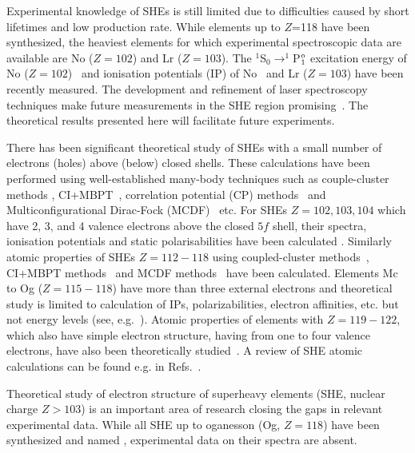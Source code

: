 \documentclass[10pt,a4paper, twoside]{report}
\begin{document}
Experimental knowledge of SHEs is still limited due to difficulties caused by  short lifetimes and low production rate.
While elements up to $Z$=118 have been synthesized, the heaviest elements for which experimental spectroscopic data 
are available are No ($Z=102$) and Lr  ($Z=103$).
The $^1$S$_0 \rightarrow ^1$P$^{\rm o}_1$ excitation energy of No  ($Z=102$)~\cite{Laatiaoui2016} 
and ionisation potentials (IP) of No~\cite{Laatiaoui2016} and Lr ($Z=103$) \cite{SAB15} have been recently measured. 
The development and refinement of laser spectroscopy techniques make future measurements in 
the SHE region promising~\cite{Laatiaoui2014, Laatiaoui20161, Ferrer2017}. 
The theoretical results presented here will facilitate future experiments. 

There has been significant theoretical study of SHEs with a small number of electrons (holes) above (below) closed shells. 
These calculations have been performed using well-established many-body techniques such  as couple-cluster methods \cite{Lindgren1986,Blundell1991}, CI+MBPT~\cite{Dzuba1996}, correlation potential (CP) methods~\cite{Dzuba1989} and Multiconfigurational Dirac-Fock (MCDF)~\cite{Grant1988} etc.  For SHEs $Z=102,103,104$ which have 2, 3, and 4 valence electrons above the  closed $5f$ shell, their spectra, ionisation potentials and static polarisabilities have been calculated \cite{Liu2007,Desclaux1980,Eliav1995,Fritzsche2007,Zou2002,Borschevsky2007,Martin1996,Mosyagin2010, DSS2014, Eliav2015, Kaldor2007}. Similarly atomic properties of SHEs  $Z=112-118$ using  coupled-cluster methods~\cite{DF2016, Pershina2008, Nash2005,Landau2001,Borschevsky2015, Thierfelder2008,Kaldor2008,Dinh2016,Indelicato2007}, CI+MBPT methods~\cite{Dinh2008, Dzuba1996} and MCDF methods~\cite{Eliav1996, Yu2008} have been calculated. 
Elements Mc to Og ($Z=115-118$) have more than three external electrons and theoretical study is limited to
calculation of IPs, polarizabilities, electron affinities, etc. but not energy levels (see, e.g.~\cite{Borschevsky2015}).
Atomic properties of elements with $Z=119-122$, which also have simple electron structure, having from one to four valence
electrons,  have also been theoretically studied~\cite{Landau2001a, Lim2005, Dinh120_2008, Dinh2008a, Gaigalas2010, Borschevsky2013, Skripnikov2013, Dzuba2013, Ginges2015, Eliav2015}. A review of SHE atomic calculations can be found  e.g. in 
Refs.~\cite{Eliav2015,Schwerdtfeger2014}.

Theoretical study of electron structure of superheavy elements (SHE, nuclear charge $Z>103$) is an important area of research closing the gaps in relevant experimental data. While all SHE up to oganesson (Og, $Z=118$) have been synthesized and named \cite{Karol2016, HHO2013, OUL2004}, experimental data on their spectra are absent.
\end{document}
